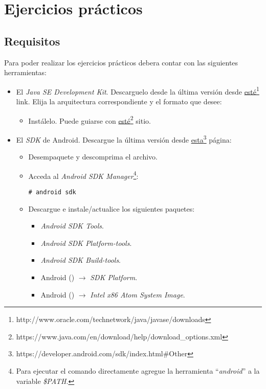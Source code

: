 \section{Ejercicios prácticos}

\subsection{Requisitos}
Para poder realizar los ejercicios prácticos debera contar con las siguientes herramientas:
\begin{itemize}
 \item El \textit{Java SE Development Kit}. Descarguelo desde la última versión desde \href{http://www.oracle.com/technetwork/java/javase/downloads}{esté}\footnote{http://www.oracle.com/technetwork/java/javase/downloads} link. Elija la arquitectura correspondiente y el formato que desee:
 \begin{itemize}
      \item Instálelo. Puede guiarse con \href{https://www.java.com/en/download/help/download\_options.xml}{esté}\footnote{https://www.java.com/en/download/help/download\_options.xml} sitio.      
 \end{itemize}

 \item El \textit{SDK} de Android. Descargue la última versión desde \href{https://developer.android.com/sdk/index.html\#Other}{esta}\footnote{https://developer.android.com/sdk/index.html\#Other} página:
 \begin{itemize}
      \item Desempaquete y descomprima el archivo.
      
      \item Acceda al \textit{Android SDK Manager}\footnote{Para ejecutar el comando directamente agregue la herramienta ``\textit{android}'' a la variable \textit{\$PATH}.}:
      \begin{lstlisting}
# android sdk
      \end{lstlisting}
     
      \item Descargue e instale/actualice los siguientes paquetes:
      \begin{itemize}
  \item \textit{Android SDK Tools}.
  \item \textit{Android SDK Platform-tools}.
  \item \textit{Android SDK Build-tools}.
  \item Android \ANDROIDVERSION(\ANDROIDVERSIONAPI) $\rightarrow$ \textit{SDK Platform}.
  \item Android \ANDROIDVERSION(\ANDROIDVERSIONAPI) $\rightarrow$ \textit{Intel x86 Atom System Image}.
      \end{itemize}


\end{itemize}
\end{itemize}
